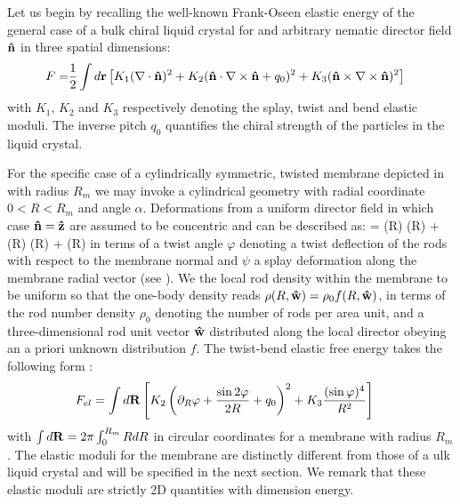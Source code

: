  
 Let us begin by recalling the well-known Frank-Oseen elastic energy of the general case of a bulk chiral liquid crystal for and arbitrary nematic director field ${\bf \hat{n}}$ in three spatial dimensions:
\begin{align} 
F = & \frac{1}{2} \int d {\bf r} \left [ K_{1} (\nabla \cdot {\bf \hat{n}})^{2}  + K_{2} ({\bf \hat{n}} \cdot \nabla \times {\bf \hat{n}} + q_{0})^{2}  +   K_{3} ({\bf \hat{n}} \times \nabla \times {\bf \hat{n}})^{2} \right ]  
\end{align}
with $K_{1}$, $K_{2}$ and $K_{3}$ respectively denoting the splay, twist and bend elastic moduli.   The inverse  pitch  $q_{0}$ quantifies the chiral strength of the particles in the liquid crystal. 


 For the specific case of a cylindrically symmetric, twisted membrane depicted in
  with radius $R_{m}$ we may invoke a cylindrical geometry  with radial coordinate $0<R< R_{m}$ and angle $\alpha$.  Deformations from a uniform director field in which case ${\bf \hat{n}} = {\bf \hat{z}}$ are assumed to be concentric and can be described as:
 \beq
 \bn = \cos \psi (R) \cos  \varphi(R) \bz + \cos \psi (R) \sin \varphi(R) \bal + \sin \psi(R) \bars
 \label{tilt}
 \eeq
in terms of a twist angle  $ \varphi $ denoting a twist deflection of the rods with respect to the membrane normal and $\psi$ a splay deformation along the membrane radial vector (see ).   We the local rod density within the membrane to be uniform so that the one-body density reads $\rho(R, {\bf \hat{w}})  = \rho_{0}f(R,  {\bf \hat{w}})$, in terms of the rod number density $\rho_{0}$ denoting the number of rods per area unit, and a three-dimensional rod unit vector ${\bf \hat{w}}$ distributed along the local director obeying an a priori unknown distribution $f$. The twist-bend elastic free energy  takes the following form \cite{barry_jpcb2009,wensink2018elastic}:
\begin{align}
 F_{el}  &= \int  d {\bf R} \left [ K_{2} \left ( \partial_{R} \varphi + \frac{\sin 2 \varphi}{2R} + q_{0} \right )^{2}  + K_{3}\frac{ ( \sin \varphi )^{4}}{R^{2}} \right   ]
\label{fmem}
\end{align}
with $\int d {\bf R} = 2 \pi \int_{0}^{R_{m}} R dR $ in circular coordinates for a membrane with radius $R_{m}$.
 The  elastic moduli for the membrane are distinctly different from those of a ulk liquid crystal and will be specified in the next section. We remark that these elastic moduli are strictly 2D quantities with dimension energy.  


